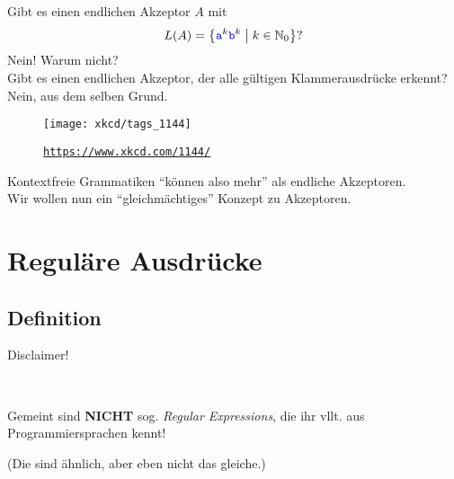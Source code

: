 
\begin{frame}[t]
	Gibt es einen endlichen Akzeptor $A$ mit $$L(A) = \left\{ \hbox{\textcolor{blue}{\texttt{a}}}^k\hbox{\textcolor{blue}{\texttt{b}}}^k \;\middle|\; k\in \mathbb{N}_0 \right\}?$$
	\pause
	Nein! Warum nicht? \\
	
	Gibt es einen endlichen Akzeptor, der alle gültigen Klammerausdrücke erkennt?\\ \pause
	Nein, aus dem selben Grund.
	\begin{figure}[H]
		\texttt{[image: xkcd/tags\_1144]}
		\caption{ \texttt{\url{https://www.xkcd.com/1144/}} }
	\end{figure}
	\pause
	Kontextfreie Grammatiken \enquote{können also mehr} als endliche Akzeptoren.\\
	Wir wollen nun ein \enquote{gleichmächtiges} Konzept zu Akzeptoren.
\end{frame}

\section{Reguläre Ausdrücke}
\subsection{Definition}

\begin{frame}{Disclaimer!}
	\begin{center}
		\Large
			 \\ \medskip
		
		Gemeint sind \textbf{NICHT} sog. \emph{Regular Expressions}, die ihr vllt. aus Programmiersprachen kennt! \\ \bigskip
		
		{\normalsize (Die sind ähnlich, aber eben nicht das gleiche.)}
	\end{center}
\end{frame}

